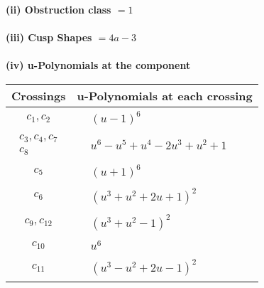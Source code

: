 \documentclass[1p]{elsarticle_modified}
\theoremstyle{definition}
\begin{document}
\flushleft \textbf{(ii) Obstruction class $= 1$}\\~\\
\flushleft \textbf{(iii) Cusp Shapes $= 4 a-3$}\\~\\
\newpage\renewcommand{\arraystretch}{1}
\flushleft \textbf{(iv) u-Polynomials at the component}\newline \\
\begin{tabular}{m{50pt}|m{274pt}}
Crossings & \hspace{64pt}u-Polynomials at each crossing \\
\hline $$\begin{aligned}c_{1},c_{2}\end{aligned}$$&$\begin{aligned}
&(u-1)^6
\end{aligned}$\\
\hline $$\begin{aligned}c_{3},c_{4},c_{7}\\c_{8}\end{aligned}$$&$\begin{aligned}
&u^6- u^5+u^4-2 u^3+u^2+1
\end{aligned}$\\
\hline $$\begin{aligned}c_{5}\end{aligned}$$&$\begin{aligned}
&(u+1)^6
\end{aligned}$\\
\hline $$\begin{aligned}c_{6}\end{aligned}$$&$\begin{aligned}
&(u^3+u^2+2 u+1)^2
\end{aligned}$\\
\hline $$\begin{aligned}c_{9},c_{12}\end{aligned}$$&$\begin{aligned}
&(u^3+u^2-1)^2
\end{aligned}$\\
\hline $$\begin{aligned}c_{10}\end{aligned}$$&$\begin{aligned}
&u^6
\end{aligned}$\\
\hline $$\begin{aligned}c_{11}\end{aligned}$$&$\begin{aligned}
&(u^3- u^2+2 u-1)^2
\end{aligned}$\\
\hline
\end{tabular}\\~\\
\end{document}
